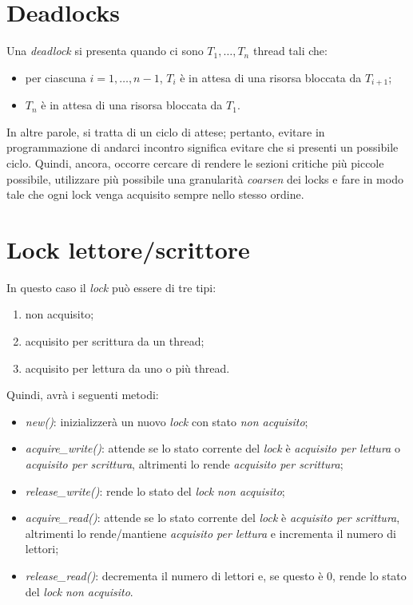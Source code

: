\section{Deadlocks}
Una \textit{deadlock} si presenta quando ci sono $T_{1}, \ldots, T_{n}$ thread tali che:
\begin{itemize}
	\item per ciascuna $i = 1, \ldots, n-1$, $T_{i}$ è in attesa di una risorsa bloccata da $T_{i+1}$;
	\item $T_{n}$ è in attesa di una risorsa bloccata da $T_{1}$.
\end{itemize}
In altre parole, si tratta di un ciclo di attese; pertanto, evitare in programmazione di andarci incontro significa evitare che si presenti un possibile ciclo.
Quindi, ancora, occorre cercare di rendere le sezioni critiche più piccole possibile, utilizzare più possibile una granularità \textit{coarsen} dei locks e fare in modo tale che ogni lock venga acquisito sempre nello stesso ordine.

\section{Lock lettore/scrittore}
In questo caso il \textit{lock} può essere di tre tipi:
\begin{enumerate}
	\item non acquisito;
	\item acquisito per scrittura da un thread;
	\item acquisito per lettura da uno o più thread.
\end{enumerate}
Quindi, avrà i seguenti metodi:
\begin{itemize}
	\item \textit{new()}: inizializzerà un nuovo \textit{lock} con stato \textit{non acquisito};
	\item \textit{acquire\_write()}: attende se lo stato corrente del \textit{lock} è \textit{acquisito per lettura} o \textit{acquisito per scrittura}, altrimenti lo rende \textit{acquisito per scrittura};
	\item \textit{release\_write()}: rende lo stato del \textit{lock} \textit{non acquisito};
	\item \textit{acquire\_read()}: attende se lo stato corrente del \textit{lock} è \textit{acquisito per scrittura}, altrimenti lo rende/mantiene \textit{acquisito per lettura} e incrementa il numero di lettori;
	\item \textit{release\_read()}: decrementa il numero di lettori e, se questo è $0$, rende lo stato del \textit{lock} \textit{non acquisito}.
\end{itemize}

